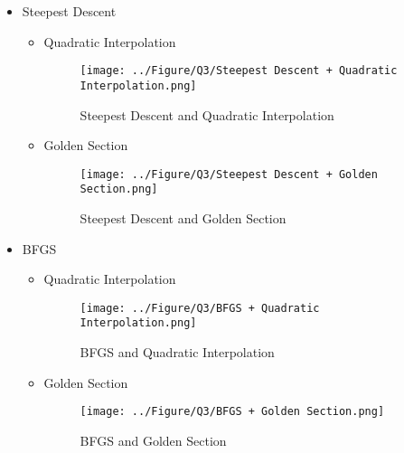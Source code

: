 \begin{itemize}
	\item Steepest Descent
	\begin{itemize}
		\item Quadratic Interpolation
		\begin{figure}[H]
			\caption{Steepest Descent and Quadratic Interpolation}
			\centering
			\texttt{[image: ../Figure/Q3/Steepest Descent + Quadratic Interpolation.png]}
		\end{figure}
		\item Golden Section
		\begin{figure}[H]
			\caption{Steepest Descent and Golden Section}
			\centering
			\texttt{[image: ../Figure/Q3/Steepest Descent + Golden Section.png]}
		\end{figure}
	\end{itemize}
	\item BFGS
	\begin{itemize}
		\item Quadratic Interpolation
		\begin{figure}[H]
			\caption{BFGS and Quadratic Interpolation}
			\centering
			\texttt{[image: ../Figure/Q3/BFGS + Quadratic Interpolation.png]}
		\end{figure}
		\item Golden Section
		\begin{figure}[H]
			\caption{BFGS and Golden Section}
			\centering
			\texttt{[image: ../Figure/Q3/BFGS + Golden Section.png]}
		\end{figure}
	\end{itemize}
\end{itemize}
